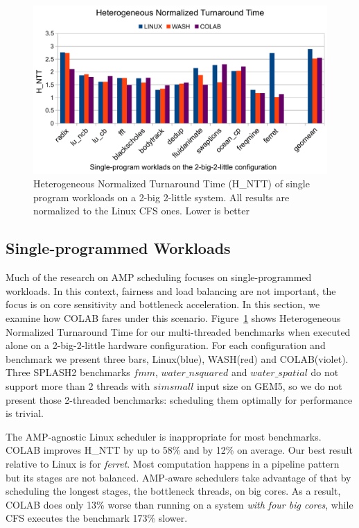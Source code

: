 \begin{figure}
\centering
\includegraphics[scale=0.45]{figures/MSW2.pdf}
\caption{Heterogeneous Normalized Turnaround Time (H\_NTT) of single program workloads on a 2-big 2-little system. All results are normalized to the Linux CFS ones. Lower is better}
\label{MSW}
\end{figure}  



\subsection{Single-programmed Workloads}
Much of the research on AMP scheduling focuses on single-programmed workloads. In this context, fairness and load balancing are not important, the focus is on core sensitivity and bottleneck acceleration. In this section, we examine how COLAB fares under this scenario. Figure~\ref{MSW} shows Heterogeneous Normalized Turnaround Time for our multi-threaded benchmarks when executed alone on a 2-big-2-little hardware configuration. For each configuration and benchmark we present three bars, Linux(blue), WASH(red) and COLAB(violet). 
Three SPLASH2 benchmarks $fmm$, $water\_nsquared$ and $water\_spatial$ do not support more than 2 threads with $simsmall$ input size on GEM5, so we do not present those 2-threaded benchmarks: scheduling them optimally for performance is trivial.

The AMP-agnostic Linux scheduler is inappropriate for most benchmarks. COLAB improves H\_NTT by up to 58\% and by 12\% on average. Our best result relative to Linux is for \emph{ferret}. Most computation happens in a pipeline pattern but its stages are not balanced. AMP-aware schedulers take advantage of that by scheduling the longest stages, the bottleneck threads, on big cores. As a result, COLAB does only 13\% worse than running on a system \emph{with four big cores}, while CFS executes the benchmark 173\% slower.

